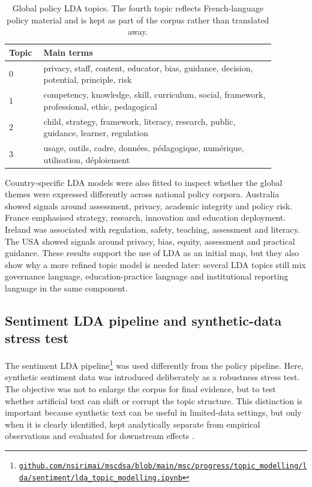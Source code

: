 \documentclass{article}
\begin{document}
\begin{table}[t]
\centering
\small
\begin{tabular}{p{0.10\linewidth}p{0.78\linewidth}}
\hline
Topic & Main terms \\
\hline
0 & privacy, staff, content, educator, bias, guidance, decision, potential, principle, risk \\
1 & competency, knowledge, skill, curriculum, social, framework, professional, ethic, pedagogical \\
2 & child, strategy, framework, literacy, research, public, guidance, learner, regulation \\
3 & usage, outils, cadre, donn\'{e}es, p\'{e}dagogique, num\'{e}rique, utilisation, d\'{e}ploiement \\
\hline
\end{tabular}
\caption{Global policy LDA topics. The fourth topic reflects French-language policy material and is kept as part of the corpus rather than translated away.}
\label{tab:lda-policy-global-topics}
\end{table}

Country-specific LDA models were also fitted to inspect whether the global themes
were expressed differently across national policy corpora. Australia showed signals
around assessment, privacy, academic integrity and policy risk. France emphasised
strategy, research, innovation and education deployment. Ireland was associated with
regulation, safety, teaching, assessment and literacy. The USA showed signals around
privacy, bias, equity, assessment and practical guidance. These results support the
use of LDA as an initial map, but they also show why a more refined topic model is
needed later: several LDA topics still mix governance language, education-practice
language and institutional reporting language in the same component.

\subsection{Sentiment LDA pipeline and synthetic-data stress test}

The sentiment LDA pipeline\footnote{\href{https://github.com/nsirimai/mscdsa/blob/main/msc/progress/topic_modelling/lda/sentiment/lda_topic_modelling.ipynb}{\texttt{github.com/nsirimai/mscdsa/blob/main/msc/progress/topic\_modelling/lda/sentiment/lda\_topic\_modelling.ipynb}}} was used differently from the policy pipeline. Here,
synthetic sentiment data was introduced deliberately as a robustness stress test. The
objective was not to enlarge the corpus for final evidence, but to test whether
artificial text can shift or corrupt the topic structure. This distinction is
important because synthetic text can be useful in limited-data settings, but only
when it is clearly identified, kept analytically separate from empirical observations
and evaluated for downstream effects
\cite{halterman2025synthetic,chen2023empirical,chim2025evaluating}.
\end{document}
